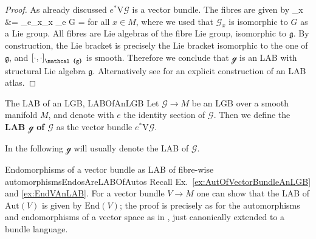 \documentclass[a4paper,oneside,11pt,bibliography=totoc]{scrartcl}
\def\bas#1\eas{\begin{align*}#1\end{align*}}
\theoremstyle{plain}
\theoremstyle{remark}
\theoremstyle{definition}
\begin{document}
\begin{proof}
\leavevmode\newline
As already discussed $e^*\mathrm{V}\mathcal{G}$ is a vector bundle. The fibres are given by
\bas
\mathcal{g}_{x}
&=
_{e_x}_x
\cong
{}_{e} G
=
\eas
for all $x \in M$, where we used that $\mathcal{G}_x$ is isomorphic to $G$ as a Lie group. All fibres are Lie algebras of the fibre Lie group, isomorphic to $\mathfrak{g}$. By construction, the Lie bracket is precisely the Lie bracket isomorphic to the one of $\mathfrak{g}$, and $\mleft[ \cdot, \cdot \mright]_{\mathcal{g}}$ is smooth. Therefore we conclude that $\mathcal{g}$ is an LAB with structural Lie algebra $\mathfrak{g}$. Alternatively see \cite[\S 3.5, Ex.\ 3.5.12, page 126]{mackenzieGeneralTheory} for an explicit construction of an LAB atlas.
\end{proof}

\begin{definitions}{The LAB of an LGB, \newline\cite[\S 3.5, special situation of Def.\ 3.5.1, page 120]{mackenzieGeneralTheory}}{LABOfAnLGB}
Let $\mathcal{G} \to M$ be an LGB over a smooth manifold $M$, and denote with $e$ the identity section of $\mathcal{G}$. Then we define the \textbf{LAB $\mathcal{g}$ of $\mathcal{G}$} as the vector bundle $e^*\mathrm{V}\mathcal{G}$.
\end{definitions}

In the following $\mathcal{g}$ will usually denote the LAB of $\mathcal{G}$.

\begin{examples}{Endomorphisms of a vector bundle as LAB of fibre-wise automorphisms}{EndosAreLABOfAutos}
Recall Ex.\ \ref{ex:AutOfVectorBundleAnLGB} and \ref{ex:EndVAnLAB}. For a vector bundle $V \to M$ one can show that the LAB of $\mathrm{Aut}(V)$ is given by $\mathrm{End}(V)$; the proof is precisely as for the automorphisms and endomorphisms of a vector space as in \cite[\S 1.5.4, page 45ff.]{Hamilton}, just canonically extended to a bundle language. 
\end{examples}
\end{document}

